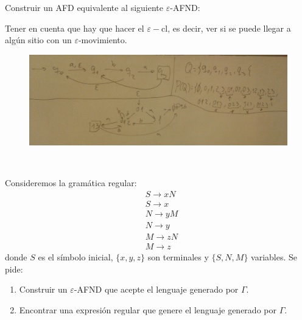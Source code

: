 \documentclass[twoside]{article}
\begin{document}
\newpage

\begin{ejercicio}{12}
Construir un AFD equivalente al siguiente $\varepsilon$-AFND:
\end{ejercicio}
\begin{solucion}
Tener en cuenta que hay que hacer el $\varepsilon-$cl, es decir, ver si se puede llegar a algún sitio con un $\varepsilon$-movimiento.

\begin{figure}[h!]
\includegraphics[scale=0.2]{Automatas/12}
\end{figure}\
\end{solucion}

\newpage

\begin{ejercicio}{13}
Consideremos la gramática regular:
\begin{align*}
&S \rightarrow xN\\
&S \rightarrow x\\
&N \rightarrow yM\\
&N \rightarrow y\\
&M \rightarrow zN\\
&M \rightarrow z
\end{align*}
donde $S$ es el símbolo inicial, $\{x, y, z\}$ son terminales y $\{S,N,M\}$ variables. Se pide:
\begin{enumerate}
\item Construir un $\varepsilon$-AFND que acepte el lenguaje generado por $\Gamma$.
\item Encontrar una expresión regular que genere el lenguaje generado por $\Gamma$.
\end{enumerate}
\end{ejercicio}
\begin{solucion}
\end{solucion}

\newpage
\end{document}
